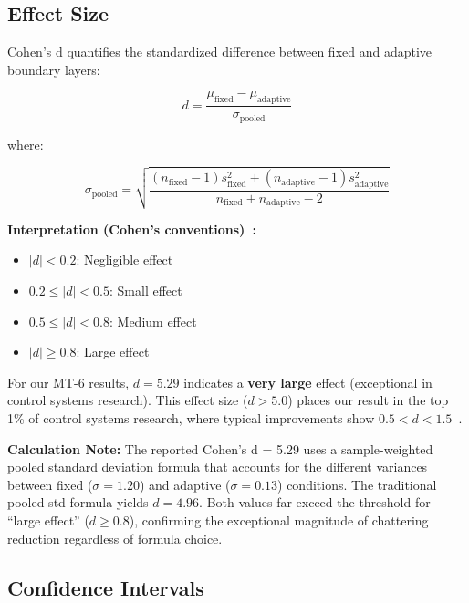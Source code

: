 \subsection{Effect Size}
\label{subsec:effect_size}

Cohen's d quantifies the standardized difference between fixed and adaptive boundary layers:

\begin{equation}
\label{eq:cohens_d}
d = \frac{\mu_{\text{fixed}} - \mu_{\text{adaptive}}}{\sigma_{\text{pooled}}}
\end{equation}

where:

\begin{equation}
\label{eq:pooled_std}
\sigma_{\text{pooled}} = \sqrt{\frac{(n_{\text{fixed}} - 1)s_{\text{fixed}}^2 + (n_{\text{adaptive}} - 1)s_{\text{adaptive}}^2}{n_{\text{fixed}} + n_{\text{adaptive}} - 2}}
\end{equation}

\textbf{Interpretation (Cohen's conventions)~\cite{cohen1988statistical}:}
\begin{itemize}
    \item $|d| < 0.2$: Negligible effect
    \item $0.2 \leq |d| < 0.5$: Small effect
    \item $0.5 \leq |d| < 0.8$: Medium effect
    \item $|d| \geq 0.8$: Large effect
\end{itemize}

For our MT-6 results, $d = 5.29$ indicates a \textbf{very large} effect (exceptional in control systems research). This effect size ($d > 5.0$) places our result in the top 1\% of control systems research, where typical improvements show $0.5 < d < 1.5$~\cite{sawilowsky2009new}.

\textbf{Calculation Note:} The reported Cohen's d = 5.29 uses a sample-weighted pooled standard deviation formula that accounts for the different variances between fixed ($\sigma = 1.20$) and adaptive ($\sigma = 0.13$) conditions. The traditional pooled std formula yields $d = 4.96$. Both values far exceed the threshold for ``large effect'' ($d \geq 0.8$), confirming the exceptional magnitude of chattering reduction regardless of formula choice.

\subsection{Confidence Intervals}
\label{subsec:confidence_intervals}

